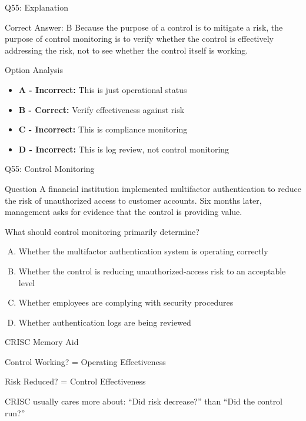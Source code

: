 \documentclass{beamer}
\begin{document}
	\begin{frame}{Q55: Explanation}
		\begin{block}{Correct Answer: B}
			Because the purpose of a control is to mitigate a risk, the purpose of control monitoring is to verify whether the control is effectively addressing the risk, not to see whether the control itself is working.
		\end{block}
		\begin{block}{Option Analysis}
			\begin{itemize}
				\item \textbf{A - Incorrect:} This is just operational status
				\item \textbf{B - Correct:} Verify effectiveness against risk
				\item \textbf{C - Incorrect:} This is compliance monitoring
				\item \textbf{D - Incorrect:} This is log review, not control monitoring
			\end{itemize}
		\end{block}
	\end{frame}
	
	
	
	\begin{frame}[shrink=10]{Q55: Control Monitoring}
		\begin{block}{Question}
			A financial institution implemented multifactor authentication
			to reduce the risk of unauthorized access to customer accounts.
			Six months later, management asks for evidence that the control
			is providing value.
			
			What should control monitoring primarily determine?
		\end{block}
		
		\begin{enumerate}[(A)]
			\item Whether the multifactor authentication system is operating correctly
			\item Whether the control is reducing unauthorized-access risk to an acceptable level
			\item Whether employees are complying with security procedures
			\item Whether authentication logs are being reviewed
		\end{enumerate}
				
		\begin{block}{CRISC Memory Aid}
			
			Control Working?	
			= Operating Effectiveness
			
			\vspace{0.1cm}
			
			Risk Reduced?
						= Control Effectiveness
			
			\vspace{0.15cm}
			
			CRISC usually cares more about:
						``Did risk decrease?''
						than			
			``Did the control run?''
			
		\end{block}
	\end{frame}
	
\end{document}

